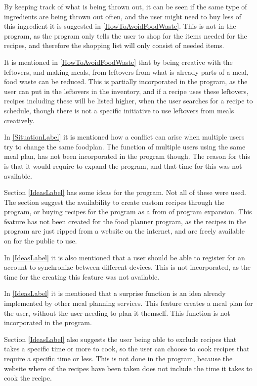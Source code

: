 By keeping track of what is being thrown out, it can be seen if the same type of ingredients are being thrown out often, and the user might need to buy less of this ingredient it is suggested in \cref{HowToAvoidFoodWaste}. This is not in the program, as the program only tells the user to shop for the items needed for the recipes, and therefore the shopping list will only consist of needed items. 

It is mentioned in \cref{HowToAvoidFoodWaste} that by being creative with the leftovers, and making meals, from leftovers from what is already parts of a meal, food waste can be reduced. This is partially incorporated in the program, as the user can put in the leftovers in the inventory, and if a recipe uses these leftovers, recipes including these will be listed higher, when the user searches for a recipe to schedule, though there is not a specific initiative to use leftovers from meals creatively.

In \cref{SituationLabel} it is mentioned how a conflict can arise when multiple users try to change the same foodplan. The function of multiple users using the same meal plan, has not been incorporated in the program though. The reason for this is that it would require to expand the program, and that time for this was not available.

Section \ref{IdeasLabel} has some ideas for the program. Not all of these were used. The section suggest the availability to create custom recipes through the program, or buying recipes for the program as a from of program expansion. This feature has not been created for the food planner program, as the recipes in the program are just ripped from a website on the internet, and are freely available on for the public to use.

In \cref{IdeasLabel} it is also mentioned that a user should be able to register for an account to synchronize between different devices. This is not incorporated, as the time for the creating this feature was not available.

In \cref{IdeasLabel} it is mentioned that a surprise function is an idea already implemented by other meal planning services. This feature creates a meal plan for the user, without the user needing to plan it themself. This function is not incorporated in the program.

Section \cref{IdeasLabel} also suggests the user being able to exclude recipes that takes a specific time or more to cook, so the user can choose to cook recipes that require a specific time or less. This is not done in the program, because the website where of the recipes have been taken does not include the time it takes to cook the recipe.


